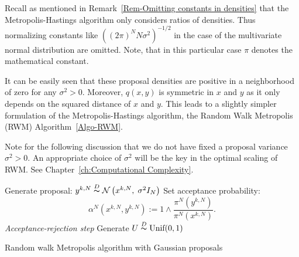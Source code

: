 Recall as mentioned in Remark~\ref{Rem-Omitting constants in densities} that the Metropolis-Hastings algorithm only considers ratios of densities. Thus normalizing constants like $ \left( (2 \pi)^{N} N \sigma^2 \right)^{-1/2} $ in the case of the multivariate normal distribution are omitted. Note, that in this particular case $\pi$ denotes the mathematical constant.

It can be easily seen that these proposal densities are positive in a neighborhood of zero for any $ \sigma^2 > 0 $. Moreover, $ q(x,y) $ is symmetric in $x$ and $y$ as it only depends on the squared distance of $x$ and $y$. This leads to a slightly simpler formulation of the Metropolis-Hastings algorithm, the Random Walk Metropolis (RWM) Algorithm~\ref{Algo-RWM}.

Note for the following discussion that we do not have fixed a proposal variance $ \sigma^2 > 0 $. An appropriate choice of $ \sigma^2 $ will be the key in the optimal scaling of RWM. See Chapter~\ref{ch:Computational Complexity}.


\IncMargin{1em}
\begin{algorithm}[htb]
\DontPrintSemicolon


\BlankLine

{
  Generate proposal: $ y^{k,N} \stackrel{D}{\thicksim} \mathcal{N}\left(x^{k,N}, \; \sigma^2 I_N\right) $\;
  Set acceptance probability:
  \begin{equation*}
   \alpha^{N} ( x^{k,N}, y^{k,N} ) := 1 \wedge \dfrac{\pi^{N}(y^{k,N}) }{\pi^{N}(x^{k,N})}.    
  \end{equation*}\label{RWMAlgo-AcceptanceProba}
  \emph{Acceptance-rejection step}\;
  Generate $ U \stackrel{D}{\thicksim} \text{Unif}(0,1) $\;

}
\caption{Random walk Metropolis algorithm with Gaussian proposals}\label{Algo-RWM}
\end{algorithm}\DecMargin{1em}


